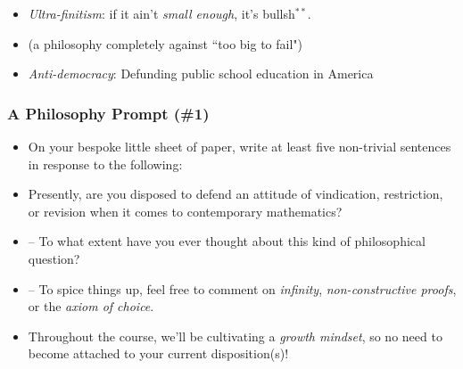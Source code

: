 \begin{frame}
\begin{itemize}[<+->]

\bigskip

\item \emph{Ultra-finitism}:  if it ain't \textit{small enough}, it's bullsh$^{**}$. 
\item[] (a philosophy completely against ``too big to fail")

\bigskip

\item \emph{Anti-democracy}: Defunding public school education in America

\end{itemize}
\end{frame}

\begin{frame}
\frametitle{A Philosophy Prompt (\#1)}

\begin{itemize}[<+->]

\item On your bespoke little sheet of paper, write at least five non-trivial sentences in response to the following:

\item Presently, are you disposed to defend an attitude of vindication, restriction, or revision when it comes to contemporary mathematics? 
\item[] -- To what extent have you ever thought about this kind of philosophical question?
\item[] -- To spice things up, feel free to comment on \emph{infinity}, \emph{non-constructive proofs}, or the \emph{axiom of choice}. 

\item Throughout the course, we'll be cultivating a \textit{growth mindset}, so no need to become attached to your current disposition(s)!



\end{itemize}
\end{frame}

\iffalse %

